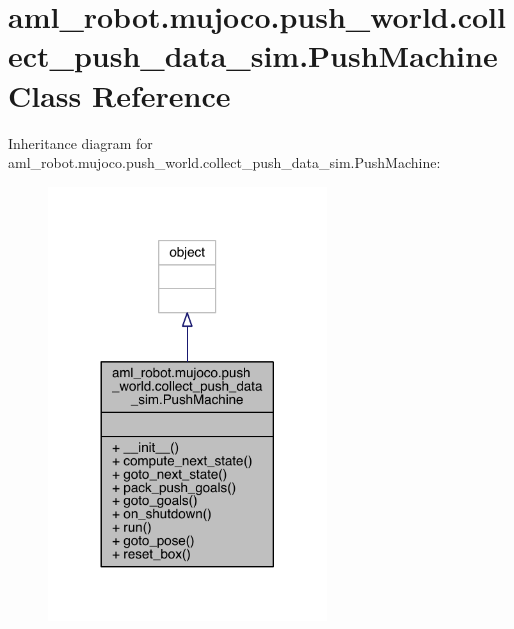 \hypertarget{classaml__robot_1_1mujoco_1_1push__world_1_1collect__push__data__sim_1_1_push_machine}{}\section{aml\+\_\+robot.\+mujoco.\+push\+\_\+world.\+collect\+\_\+push\+\_\+data\+\_\+sim.\+Push\+Machine Class Reference}
\label{classaml__robot_1_1mujoco_1_1push__world_1_1collect__push__data__sim_1_1_push_machine}


Inheritance diagram for aml\+\_\+robot.\+mujoco.\+push\+\_\+world.\+collect\+\_\+push\+\_\+data\+\_\+sim.\+Push\+Machine\+:\nopagebreak
\begin{figure}[H]
\begin{center}
\leavevmode
\includegraphics[width=209pt]{classaml__robot_1_1mujoco_1_1push__world_1_1collect__push__data__sim_1_1_push_machine__inherit__graph}
\end{center}
\end{figure}


